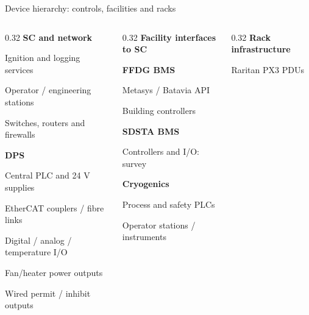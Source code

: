 \begin{frame}{Device hierarchy: controls, facilities and racks}
\small
\begin{columns}[T,onlytextwidth]
\begin{column}{0.32\textwidth}
\textbf{SC and network}\par
\hspace*{0.8em}Ignition and logging services\par
\hspace*{0.8em}Operator / engineering stations\par
\hspace*{0.8em}Switches, routers and firewalls\par\bigskip
\textbf{DPS}\par
\hspace*{0.8em}Central PLC and 24 V supplies\par
\hspace*{0.8em}EtherCAT couplers / fibre links\par
\hspace*{0.8em}Digital / analog / temperature I/O\par
\hspace*{0.8em}Fan/heater power outputs\par
\hspace*{0.8em}Wired permit / inhibit outputs
\end{column}
\begin{column}{0.32\textwidth}
\textbf{Facility interfaces to SC}\par\medskip
\textbf{FFDG BMS}\par
\hspace*{0.8em}Metasys / Batavia API\par
\hspace*{0.8em}Building controllers\par\medskip
\textbf{SDSTA BMS}\par
\hspace*{0.8em}Controllers and I/O: survey\par\medskip
\textbf{Cryogenics}\par
\hspace*{0.8em}Process and safety PLCs\par
\hspace*{0.8em}Operator stations / instruments
\end{column}
\begin{column}{0.32\textwidth}
\textbf{Rack infrastructure}\par
\hspace*{0.8em}Raritan PX3 PDUs\par

\end{column}
\end{columns}
\end{frame}

